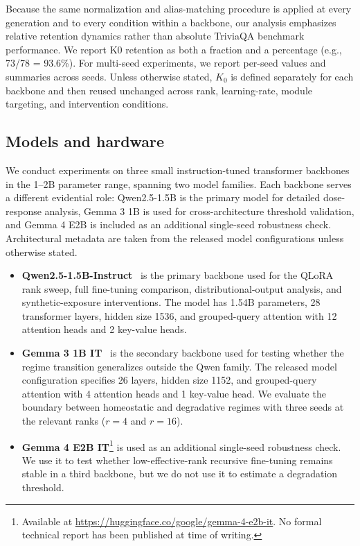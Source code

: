 \documentclass[a4paper,fleqn]{cas-dc}
\begin{document}
Because the same normalization and alias-matching procedure is applied at every
generation and to every condition within a backbone, our analysis emphasizes
relative retention dynamics rather than absolute TriviaQA benchmark performance.
We report K0 retention as both a fraction and a percentage (e.g.,
73/78 = 93.6\%). For multi-seed experiments, we report per-seed values and
summaries across seeds. Unless otherwise stated, $K_0$ is defined separately
for each backbone and then reused unchanged across rank, learning-rate, module
targeting, and intervention conditions.

\subsection{Models and hardware}\label{sec:models}

We conduct experiments on three small instruction-tuned transformer backbones in
the 1--2B parameter range, spanning two model families. Each backbone serves a
different evidential role: Qwen2.5-1.5B is the primary model for detailed
dose-response analysis, Gemma 3 1B is used for cross-architecture threshold
validation, and Gemma 4 E2B is included as an additional single-seed robustness
check. Architectural metadata are taken from the released model configurations
unless otherwise stated.

\begin{itemize}
    \item \textbf{Qwen2.5-1.5B-Instruct}~\citep{qwen2024} is the primary
    backbone used for the QLoRA rank sweep, full fine-tuning comparison,
    distributional-output analysis, and synthetic-exposure interventions. The
    model has 1.54B parameters, 28 transformer layers, hidden size 1536, and
    grouped-query attention with 12 attention heads and 2 key-value heads.

    \item \textbf{Gemma 3 1B IT}~\citep{gemma2025} is the secondary backbone
    used for testing whether the regime transition generalizes outside the Qwen
    family. The released model configuration specifies 26 layers, hidden size
    1152, and grouped-query attention with 4 attention heads and 1 key-value
    head. We evaluate the boundary between homeostatic and degradative regimes
    with three seeds at the relevant ranks ($r=4$ and $r=16$).

    \item \textbf{Gemma 4 E2B IT}\footnote{Available at
    \url{https://huggingface.co/google/gemma-4-e2b-it}. No formal technical
    report has been published at time of writing.} is used as an additional
    single-seed robustness check. We use it to test whether low-effective-rank
    recursive fine-tuning remains stable in a third backbone, but we do not use
    it to estimate a degradation threshold.
\end{itemize}
\end{document}
